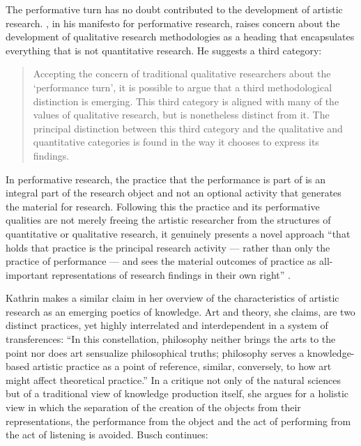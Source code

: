 \documentclass[11pt]{article}
\begin{document}
The performative turn has no doubt contributed
to the development of artistic research. \citet{Haseman2006}, in his
manifesto for performative research, raises concern about the development of
qualitative research methodologies as a heading that encapsulates
everything that is not quantitative research. He suggests a third category:
\begin{quote}
  Accepting the concern of traditional qualitative researchers about
  the ‘performance turn’, it is possible to argue that a third
  methodological distinction is emerging. This third category is
  aligned with many of the values of qualitative research, but is
  nonetheless distinct from it. The principal distinction between this
  third category and the qualitative and quantitative categories is
  found in the way it chooses to express its
  findings. \citep[p. 102]{Haseman2006} 
\end{quote}
In performative research, the practice that the performance is part of
is an integral part of the research object and not an optional
activity that generates the material for research. Following this the
practice and its performative qualities are not merely freeing the
artistic researcher from the structures of quantitative or qualitative research, it
genuinely presents a novel approach ``that holds that practice is the
principal research activity — rather than only the practice of
performance — and sees the material outcomes of practice as
all-important representations of research findings in their own
right'' \citep[p. 103]{Haseman2006}. 

Kathrin \citet{Busch2009} makes a similar claim in her overview of
the characteristics of artistic research as an emerging poetics of
knowledge. Art and theory, she claims, 
are two distinct practices, yet highly interrelated and interdependent
in a system of transferences: ``In this constellation, philosophy
neither brings the arts to the point nor does art sensualize
philosophical truths; philosophy serves a knowledge-based artistic
practice as a point of reference, similar, conversely, to how art
might affect theoretical practice.'' \citep[p. 1]{Busch2009} In a
critique not only of the natural sciences but of a traditional view of knowledge production itself,
she argues for a holistic view in which the separation of the creation of the objects from
their representations, the performance from the object and the act of
performing from the act of listening is avoided. Busch continues:
\end{document}
